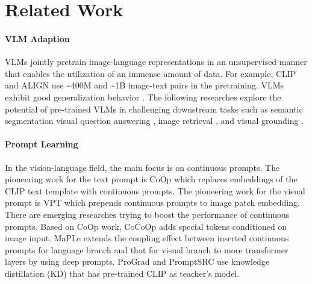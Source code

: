 \section{Related Work}
\label{sec:work_relate}


\paragraph{VLM Adaption} VLMs jointly pretrain image-language representations in an unsupervised manner that enables the utilization of an immense amount of data. For example, CLIP \cite{radford2021learning} and ALIGN \cite{jia2021scaling} use \textasciitilde400M and \textasciitilde1B image-text pairs in the pretraining. VLMs exhibit good generalization behavior \cite{radford2021learning,jia2021scaling,yao2021filip,li2021supervision,singh2022flava}. The following researches explore the potential of pre-trained VLMs in challenging downstream tasks such as semantic segmentation \cite{rao2022denseclip} visual question answering \cite{tan2019lxmert}, image retrieval \cite{lu2019vilbert}, and visual grounding \cite{yao2024cpt}.

\paragraph{Prompt Learning} In the vision-language field, the main focus is on continuous prompts. The pioneering work for the text prompt is CoOp \cite{zhou2022learning} which replaces embeddings of the CLIP text template with continuous prompts. The pioneering work for the visual prompt is VPT which prepends continuous prompts to image patch embedding. There are emerging researches trying to boost the performance of continuous prompts. Based on CoOp work, CoCoOp \cite{zhou2022conditional} adds special tokens conditioned on image input. MaPLe \cite{khattak2023maple} extends the coupling effect between inserted continuous prompts for language branch and that for visual branch to more transformer layers by using deep prompts. ProGrad \cite{zhu2023prompt} and PromptSRC \cite{khattak2023self} use knowledge distillation (KD) that has pre-trained CLIP as teacher's model.